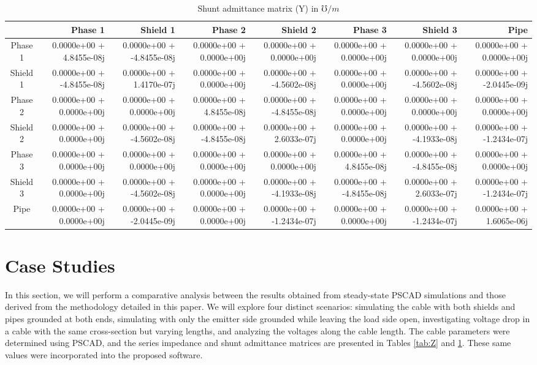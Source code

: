 \documentclass[journal,transmag]{IEEEtran}
\begin{document}
\begin{table}[t!]
\tiny %
\centering
\caption{Shunt admittance matrix (Y) in $\mho/m$}
\label{tab:Y}
\begin{tabular}{crrrrrrr}
\toprule
 & Phase 1 & Shield 1 & Phase 2 & Shield 2 & Phase 3 & Shield 3 & Pipe \\
\midrule
Phase 1 & 0.0000e+00 + 4.8455e-08j & 0.0000e+00 + -4.8455e-08j & 0.0000e+00 + 0.0000e+00j & 0.0000e+00 + 0.0000e+00j & 0.0000e+00 + 0.0000e+00j & 0.0000e+00 + 0.0000e+00j & 0.0000e+00 + 0.0000e+00j \\
Shield 1 & 0.0000e+00 + -4.8455e-08j & 0.0000e+00 + 1.4170e-07j & 0.0000e+00 + 0.0000e+00j & 0.0000e+00 + -4.5602e-08j & 0.0000e+00 + 0.0000e+00j & 0.0000e+00 + -4.5602e-08j & 0.0000e+00 + -2.0445e-09j \\
Phase 2 & 0.0000e+00 + 0.0000e+00j & 0.0000e+00 + 0.0000e+00j & 0.0000e+00 + 4.8455e-08j & 0.0000e+00 + -4.8455e-08j & 0.0000e+00 + 0.0000e+00j & 0.0000e+00 + 0.0000e+00j & 0.0000e+00 + 0.0000e+00j \\
Shield 2 & 0.0000e+00 + 0.0000e+00j & 0.0000e+00 + -4.5602e-08j & 0.0000e+00 + -4.8455e-08j & 0.0000e+00 + 2.6033e-07j & 0.0000e+00 + 0.0000e+00j & 0.0000e+00 + -4.1933e-08j & 0.0000e+00 + -1.2434e-07j \\
Phase 3 & 0.0000e+00 + 0.0000e+00j & 0.0000e+00 + 0.0000e+00j & 0.0000e+00 + 0.0000e+00j & 0.0000e+00 + 0.0000e+00j & 0.0000e+00 + 4.8455e-08j & 0.0000e+00 + -4.8455e-08j & 0.0000e+00 + 0.0000e+00j \\
Shield 3 & 0.0000e+00 + 0.0000e+00j & 0.0000e+00 + -4.5602e-08j & 0.0000e+00 + 0.0000e+00j & 0.0000e+00 + -4.1933e-08j & 0.0000e+00 + -4.8455e-08j & 0.0000e+00 + 2.6033e-07j & 0.0000e+00 + -1.2434e-07j \\
Pipe & 0.0000e+00 + 0.0000e+00j & 0.0000e+00 + -2.0445e-09j & 0.0000e+00 + 0.0000e+00j & 0.0000e+00 + -1.2434e-07j & 0.0000e+00 + 0.0000e+00j & 0.0000e+00 + -1.2434e-07j & 0.0000e+00 + 1.6065e-06j \\
\bottomrule
\end{tabular}
\end{table}


\section{Case Studies}

In this section, we will perform a comparative analysis between the results obtained from steady-state PSCAD simulations and those derived from the methodology detailed in this paper. We will explore four distinct scenarios: simulating the cable with both shields and pipes grounded at both ends, simulating with only the emitter side grounded while leaving the load side open, investigating voltage drop in a cable with the same cross-section but varying lengths, and analyzing the voltages along the cable length. The cable parameters were determined using PSCAD, and the series impedance and shunt admittance matrices are presented in Tables \ref{tab:Z} and \ref{tab:Y}. These same values were incorporated into the proposed software.
\end{document}
